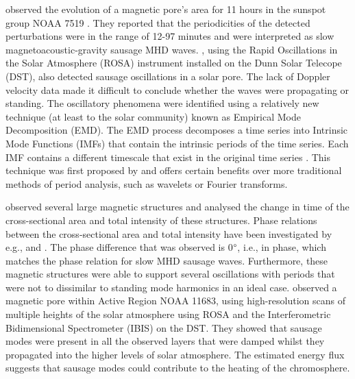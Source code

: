     \cite{doretala2008} observed the evolution of a magnetic pore's area for 11 hours in the sunspot group NOAA 7519 \citep[see][]{1997A&A...328..682S,doretalb}.
    They reported that the periodicities of the detected perturbations were in the range of 12-97 minutes and were interpreted as slow magnetoacoustic-gravity sausage MHD waves.
    \citet{morton2011}, using the Rapid Oscillations in the Solar Atmosphere (ROSA) instrument installed on the Dunn Solar Telecope (DST), also detected sausage oscillations in a solar pore. 
    The lack of Doppler velocity data made it difficult to conclude whether the waves were propagating or standing.
    The oscillatory phenomena were identified using a relatively new technique (at least to the solar community) known as Empirical Mode Decomposition (EMD).
    The EMD process decomposes a time series into Intrinsic Mode Functions (IMFs) that contain the intrinsic periods of the time series.
    Each IMF contains a different timescale that exist in the original time series \citep[see][]{terradas}.
    This technique was first proposed by \citet{huang} and offers certain benefits over more traditional methods of period analysis, such as wavelets or Fourier transforms. 
    
    \cite{Dorotovic2014} observed several large magnetic structures and analysed the change in time of the cross-sectional area and total intensity of these structures.
    Phase relations between the cross-sectional area and total intensity have been investigated by e.g., \citet{Moreels2013} and \citet{Moreels2013b}.
    The phase difference that was observed is 0$\degree$, i.e., in phase, which matches the phase relation for slow MHD sausage waves.   
    Furthermore, these magnetic structures were able to support several oscillations with periods that were not to dissimilar to standing mode harmonics in an ideal case.    
	\cite{0004-637X-806-1-132} observed a magnetic pore within Active Region NOAA 11683, using high-resolution scans of multiple heights of the solar atmosphere using ROSA and the Interferometric Bidimensional Spectrometer (IBIS) on the DST.
	They showed that sausage modes were present in all the observed layers that were damped whilst they propagated into the higher levels of solar atmosphere.
	The estimated energy flux suggests that sausage modes could contribute to the heating of the chromosphere.
    
